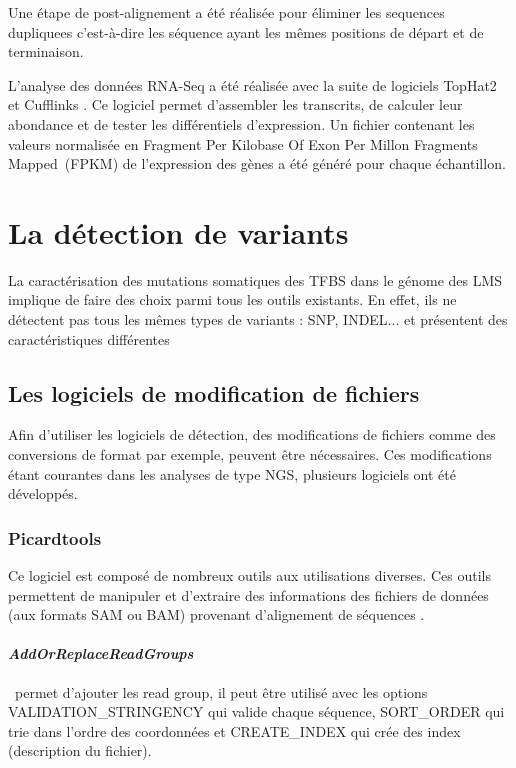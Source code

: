 Une étape de post-alignement a été réalisée pour éliminer les \gls{sequences dupliquees} c'est-à-dire les séquence ayant les mêmes positions de départ et de terminaison.

L'analyse des données RNA-Seq a été réalisée avec la suite de logiciels TopHat2 \citep{Tophat} et Cufflinks \citep{Cufflinks}. Ce logiciel permet d'assembler les transcrits, de calculer leur abondance et de tester les différentiels d'expression. Un fichier contenant les valeurs normalisée en \og Fragment Per Kilobase Of Exon Per Millon Fragments Mapped\fg ~(FPKM) de l'expression des gènes a été généré pour chaque échantillon.

\newpage
\section{La détection de variants}\label{sec:detection}

La caractérisation des mutations somatiques des TFBS dans le génome des LMS implique de faire des choix parmi tous les outils existants. En effet, ils ne détectent pas tous les mêmes types de variants : SNP, INDEL... et présentent des caractéristiques différentes

\subsection{Les logiciels de modification de fichiers}\label{subsec:manip}

Afin d'utiliser les logiciels de détection, des modifications de fichiers comme des conversions de format par exemple, peuvent être nécessaires. Ces modifications étant courantes dans les analyses de type NGS, plusieurs logiciels ont été développés.

\subsubsection{Picardtools}

Ce logiciel est composé de nombreux outils aux utilisations diverses. Ces outils permettent de manipuler et d'extraire des informations des fichiers de données  (aux formats SAM ou BAM) provenant d'alignement de séquences \citep{Picard}.
\paragraph*{\textit{AddOrReplaceReadGroups}} ~permet d'ajouter les \og \gls{read group}\fg , il peut être utilisé avec les options VALIDATION\_STRINGENCY qui valide chaque séquence, SORT\_ORDER qui trie dans l'ordre des coordonnées et CREATE\_INDEX qui crée des index (description du fichier).
